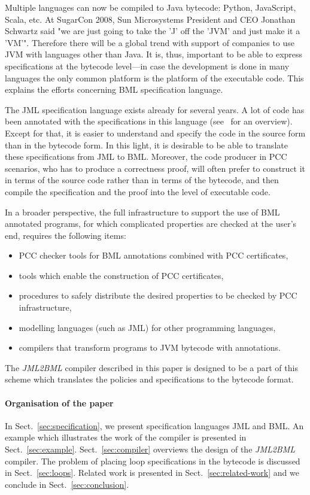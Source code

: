 \documentclass{llncs}
\newcommand{\jmltobmltext}{JML2BML}
\newcommand{\jmltobml}{\textsl{\jmltobmltext}\xspace}
\newcommand{\hs}{\hspace{0.5pt}}
\begin{document}
Multiple languages can now be compiled to Java bytecode: Python,
JavaScript, Scala, etc.  At SugarCon 2008, Sun Microsystems President
and CEO Jonathan Schwartz said "we are just going to take the 'J' off
the 'JVM' and just make it a 'VM'". Therefore there will be a global
trend with support of companies to use JVM with languages other than
Java.  It is, thus, important to be able to express specifications at
the bytecode level\hs{}---\hs{}in case the development is done in many
languages the only common platform is the platform of the executable
code. This explains the efforts concerning BML specification language.

The JML specification language exists already for several years. A lot of code has been annotated with the
specifications in this language (see~\cite{overviewOfJML} for an
overview). Except for that, it is easier to understand and specify the
code in the source form than in the bytecode form. In this light, it
is desirable to be able to translate these specifications from JML to
BML. Moreover, the code producer in PCC scenarios, who has to produce
a correctness proof, will often prefer to construct it in terms
of the source code rather than in terms of the bytecode, and then compile the
specification and the proof into the level of executable code.

In a broader perspective, the full infrastructure to support the use
of BML annotated programs, for which complicated properties are
checked at the user's end, requires the following items:
\begin{itemize}
\item PCC checker tools for BML annotations combined with
  PCC certificates,
\item tools which enable the construction of PCC certificates,
\item procedures to safely distribute the desired properties to be
  checked by PCC infrastructure,
\item modelling languages (such as JML) for other programming
  languages,
\item compilers that transform programs to JVM bytecode with
  annotations.
\end{itemize}
The \jmltobml compiler described in this paper is designed to be a
part of this scheme which translates the policies and specifications
to the bytecode format.

\vspace*{-0.3\baselineskip}

\paragraph{Organisation of the paper}
In Sect.~\ref{sec:specification}, we present specification
languages JML and BML. An example which illustrates the work of the
compiler is presented in Sect.~\ref{sec:example}.
Sect.~\ref{sec:compiler} overviews the design of the \jmltobml
compiler. The problem of placing loop specifications in the bytecode is discussed in Sect.~\ref{sec:loops}. Related work is presented in
Sect.~\ref{sec:related-work} and we conclude in
Sect.~\ref{sec:conclusion}.
\end{document}
